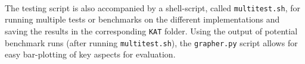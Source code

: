 \medskip\\
The testing script is also accompanied by a shell-script, called \texttt{multitest.sh}, for running multiple tests or benchmarks on the different implementations and saving the results in the corresponding \texttt{KAT} folder. Using the output of potential benchmark runs (after running \texttt{multitest.sh}), the \texttt{grapher.py} script allows for easy bar-plotting of key aspects for evaluation.